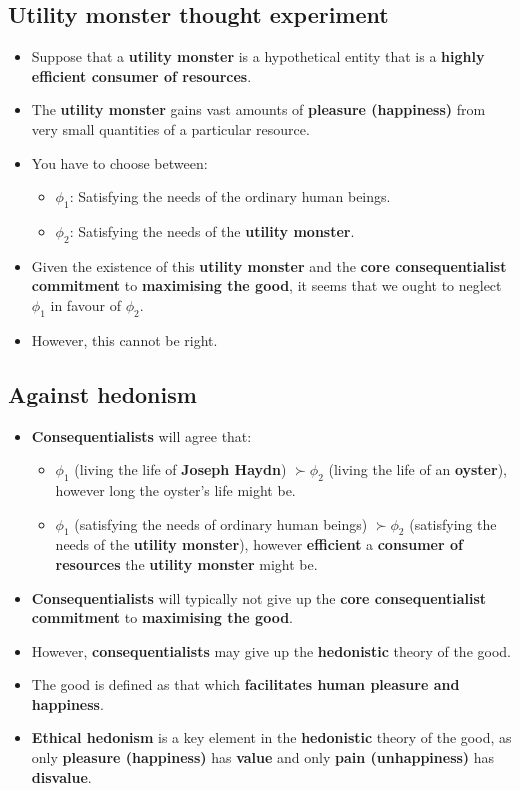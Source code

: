 \documentclass[11pt]{article}
\begin{document}
\subsection{Utility monster thought experiment}
\label{sec:org19923a4}
\begin{itemize}
\item Suppose that a \textbf{utility monster} is a hypothetical entity that is a \textbf{highly efficient consumer of resources}.
\item The \textbf{utility monster} gains vast amounts of \textbf{pleasure (happiness)} from very small quantities of a particular resource.
\item You have to choose between:
\begin{itemize}
\item \(\phi_1\): Satisfying the needs of the ordinary human beings.
\item \(\phi_2\): Satisfying the needs of the \textbf{utility monster}.
\end{itemize}
\item Given the existence of this \textbf{utility monster} and the \textbf{core consequentialist commitment} to \textbf{maximising the good}, it seems that we ought to neglect \(\phi_1\) in favour of \(\phi_2\).
\item However, this cannot be right.
\end{itemize}
\subsection{Against hedonism}
\label{sec:org5aac89a}
\begin{itemize}
\item \textbf{Consequentialists} will agree that:
\begin{itemize}
\item \(\phi_1\) (living the life of \textbf{Joseph Haydn}) \(\succ \phi_2\) (living the life of an \textbf{oyster}), however long the oyster's life might be.
\item \(\phi_1\) (satisfying the needs of ordinary human beings) \(\succ \phi_2\) (satisfying the needs of the \textbf{utility monster}), however \textbf{efficient} a \textbf{consumer of resources} the \textbf{utility monster} might be.
\end{itemize}
\item \textbf{Consequentialists} will typically not give up the \textbf{core consequentialist commitment} to \textbf{maximising the good}.
\item However, \textbf{consequentialists} may give up the \textbf{hedonistic} theory of the good.
\item The good is defined as that which \textbf{facilitates human pleasure and happiness}.
\item \textbf{Ethical hedonism} is a key element in the \textbf{hedonistic} theory of the good, as only \textbf{pleasure (happiness)} has \textbf{value} and only \textbf{pain (unhappiness)} has \textbf{disvalue}.
\end{itemize}
\end{document}
